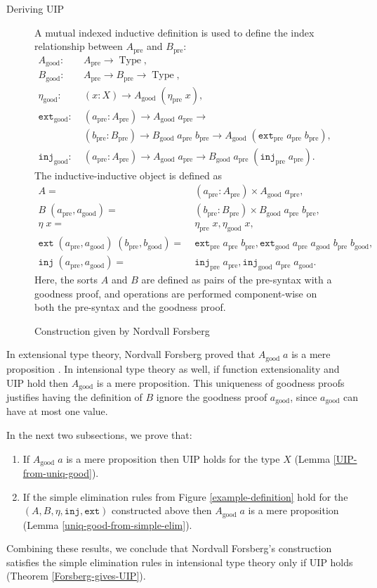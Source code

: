 \documentclass[runningheads]{llncs}
\DeclareMathOperator{\USet}{Type}
\newcommand{\pre}[1]{{#1}_\text{pre}}
\newcommand{\good}[1]{{#1}_\text{good}}
\newcommand{\join}{\texttt{ext}}
\newcommand{\inj}{\texttt{inj}}
\def\Forsberg/{Nordvall Forsberg}
\begin{document}
\begin{section}{Deriving UIP}
\begin{figure}[htpb]
\begin{flushleft}
A mutual indexed inductive definition is used to define the index relationship between $\pre{A}$ and $\pre{B}$:
\begin{align*}
\good{A}:&\; \pre{A}\to\USet,\\
\good{B}:&\; \pre{A}\to\pre{B}\to\USet,\\
\good{\eta}:&\; (x : X) \to \good{A}\;(\pre{\eta}\;x),\\
\good{\join}:&\; (\pre{a} : \pre{A})\to\good{A}\;\pre{a}\to\\&\;(\pre{b} : \pre{B})\to\good{B}\;\pre{a}\;\pre{b}\to\good{A}\;(\pre{\join}\;\pre{a}\;\pre{b}),\\
\good{\inj}:&\;(\pre{a}:\pre{A})\to\good{A}\;\pre{a}\to\good{B}\;\pre{a}\;(\pre{\inj}\;\pre{a}).
\end{align*}
The inductive-inductive object is defined as
\begin{align*}
A =&\; (\pre{a} : \pre{A})\times \good{A}\;\pre{a},\\
B\; (\pre{a},\good{a}) =&\; (\pre{b} : \pre{B})\times\good{B}\;\pre{a}\;\pre{b},\\
\eta\;x =&\;\pre{\eta}\;x,\good{\eta}\;x,\\
\join\;(\pre{a},\good{a})\;(\pre{b},\good{b})=&\; \pre{\join}\;\pre{a}\;\pre{b}, \good{\join}\;\pre{a}\;\good{a}\;\pre{b}\;\good{b},\\
\inj\;(\pre{a},\good{a})=&\;\pre{\inj}\;\pre{a}, \good{\inj}\;\pre{a}\;\good{a}.
\end{align*}
Here, the sorts $A$ and $B$ are defined as pairs of the pre-syntax with a goodness proof, and operations are performed component-wise on both the pre-syntax and the goodness proof.
\end{flushleft}
\caption{\label{example-good-mutind}Construction given by \Forsberg/}
\end{figure}

In extensional type theory, \Forsberg/ proved that $\good{A}\;a$ is a mere proposition \citep[][Lemma 5.37(ii)]{nordvallforsberg2013thesis}. In intensional type theory as well, if function extensionality and UIP hold then $\good{A}$ is a mere proposition. This uniqueness of goodness proofs justifies having the definition of $B$ ignore the goodness proof $\good{a}$, since $\good{a}$ can have at most one value.

In the next two subsections, we prove that:
\begin{enumerate}
    \item If $\good{A}\;a$ is a mere proposition then UIP holds for the type $X$ (Lemma \ref{UIP-from-uniq-good}).
    \item If the simple elimination rules from Figure \ref{example-definition} hold for the $(A, B, \eta, \inj, \join)$ constructed above then $\good{A}\;a$ is a mere proposition (Lemma \ref{uniq-good-from-simple-elim}).
\end{enumerate}
Combining these results, we conclude that \Forsberg/'s construction satisfies the simple elimination rules in intensional type theory only if UIP holds (Theorem \ref{Forsberg-gives-UIP}).


\end{section}
\end{document}
